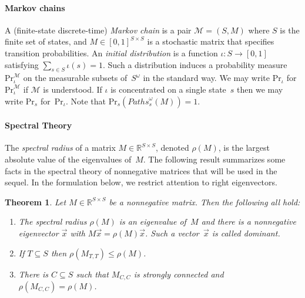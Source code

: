 \documentclass{elsarticle}
\newtheorem{theorem}[definition]{Theorem}
\def\Real{\mathbb{R}}
\def\cM{\mathcal{M}}
\def\Pr{\mathrm{Pr}}
\def\Paths{\mathit{Paths}}
\begin{document}
\paragraph*{Markov chains}
A (finite-state discrete-time) \emph{Markov chain} is a pair
$\cM = (S,M)$ where $S$ is the finite set of states, and
$M \in [0,1]^{S \times S}$ is a stochastic matrix that specifies
transition probabilities.  An \emph{initial distribution} is a
function $\iota : S \to [0,1]$ satisfying
$\sum_{s \in S} \iota(s) = 1$.  Such a distribution induces a
probability measure~$\Pr^{\cM}_\iota$ on the measurable subsets
of~$S^\omega$ in the standard way.
We may write $\Pr_\iota$ for~$\Pr^{\cM}_\iota$ if $\cM$ is understood.
If $\iota$ is concentrated on a
single state~$s$ then we may write $\Pr_s$
for~$\Pr_\iota$.  Note that
$\Pr_s(\Paths^\omega_s(M)) = 1$.

\paragraph*{Spectral Theory}
The \emph{spectral radius} of a matrix $M \in \Real^{S \times S}$,
denoted $\rho(M)$, is the largest absolute value of the eigenvalues
of~$M$.  The following result summarizes some facts in the spectral
theory of nonnegative matrices that will be used in the sequel.
In the
formulation below, we restrict attention to right eigenvectors.


\begin{theorem}
  Let $M\in \mathbb{R}^{S\times S}$ be a nonnegative matrix.  Then
  the following all hold:
\begin{enumerate}
\item The spectral radius $\rho(M)$ is an eigenvalue of~$M$ and there
  is a nonnegative eigenvector $\vec{x}$ with
  $M\vec{x}=\rho(M)\vec{x}$.
  Such a vector~$\vec{x}$ is called \emph{dominant}.
\item If $T \subseteq S$ then $\rho(M_{T,T}) \le \rho(M)$.
\item There is $C \subseteq S$ such that $M_{C,C}$ is strongly connected and $\rho(M_{C,C}) = \rho(M)$.
\end{enumerate}
\label{thm:nonnegative}
\end{theorem}
\end{document}
